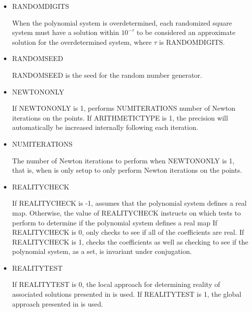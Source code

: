 \documentclass[11pt]{report}
\begin{document}
\begin{itemize}
\item RANDOMDIGITS

When the polynomial system is overdetermined, each randomized square system must
have a solution within $10^{-\tau}$ to be considered an approximate solution
for the overdetermined system, where $\tau$ is RANDOMDIGITS.

\item RANDOMSEED

RANDOMSEED is the seed for the random number generator.

\item NEWTONONLY

If NEWTONONLY is 1, \alphaCertifiedS performs NUMITERATIONS number of Newton iterations on the points.
If ARITHMETICTYPE is 1, the precision will automatically be increased internally following each iteration.

\item NUMITERATIONS

The number of Newton iterations to perform when NEWTONONLY is 1, that is, when \alphaCertifiedS is
only setup to only perform Newton iterations on the points.

\item REALITYCHECK

If REALITYCHECK is -1, \alphaCertifiedS assumes that the polynomial system defines a real map.
Otherwise, the value of REALITYCHECK instructs \alphaCertifiedS on which tests to perform
to determine if the polynomial system defines a real map
If REALITYCHECK is 0, \alphaCertifiedS only checks to see if all of the coefficients
are real.  If REALITYCHECK is 1, \alphaCertifiedS checks the coefficients as well as
checking to see if the polynomial system, as a set, is invariant under conjugation.

\item REALITYTEST

If REALITYTEST is 0, the local approach for determining reality of associated solutions
presented in \cite{HS10} is used.  If REALITYTEST is 1, the global approach presented
in \cite{HS10} is used.

\end{itemize}
\end{document}
